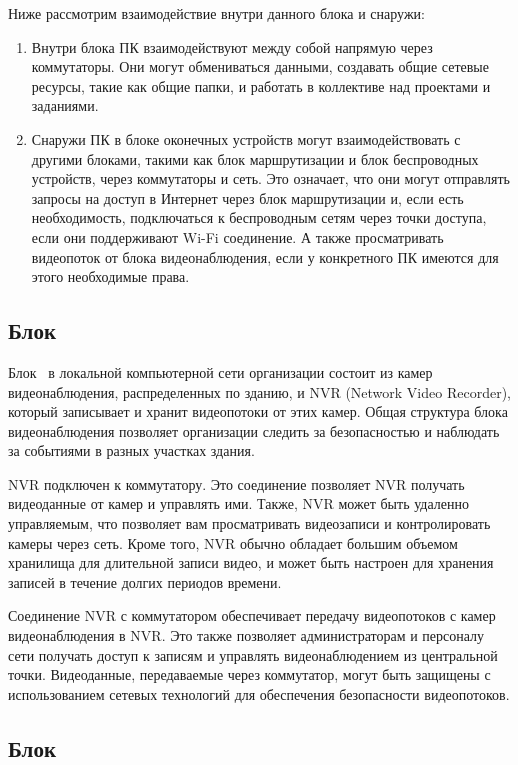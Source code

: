Ниже рассмотрим взаимодействие внутри данного блока и снаружи:
\begin{enumerate}
    \item Внутри блока ПК взаимодействуют между собой напрямую через коммутаторы. 
    Они могут обмениваться данными, создавать общие сетевые ресурсы, такие как общие папки, и работать в коллективе над проектами и заданиями.
    
    \item Снаружи ПК в блоке оконечных устройств могут взаимодействовать с другими блоками, 
    такими как блок маршрутизации и блок беспроводных устройств, через коммутаторы и сеть. 
    Это означает, что они могут отправлять запросы на доступ в Интернет через блок маршрутизации и,
    если есть необходимость, подключаться к беспроводным сетям через точки доступа, если они поддерживают Wi-Fi соединение.
    А также просматривать видеопоток от блока видеонаблюдения, если у конкретного ПК имеются для этого необходимые права. 
\end{enumerate}

\subsection{Блок \blockVideo}

Блок \blockVideo\ в локальной компьютерной сети организации состоит из камер видеонаблюдения, распределенных по зданию, и NVR (Network Video Recorder), 
который записывает и хранит видеопотоки от этих камер. 
Общая структура блока видеонаблюдения позволяет организации следить за безопасностью и наблюдать за событиями в разных участках здания. 

NVR подключен к коммутатору. Это соединение позволяет NVR получать видеоданные от камер и управлять ими. 
Также, NVR может быть удаленно управляемым, что позволяет вам просматривать видеозаписи и контролировать камеры через сеть.
Кроме того, NVR обычно обладает большим объемом хранилища для длительной записи видео, 
и может быть настроен для хранения записей в течение долгих периодов времени.

Соединение NVR с коммутатором обеспечивает передачу видеопотоков с камер видеонаблюдения в NVR.
Это также позволяет администраторам и персоналу сети получать доступ к записям и управлять видеонаблюдением из центральной точки.
Видеоданные, передаваемые через коммутатор, могут быть защищены с использованием сетевых технологий для обеспечения безопасности видеопотоков.

\subsection{Блок \blockAccessPoint}

